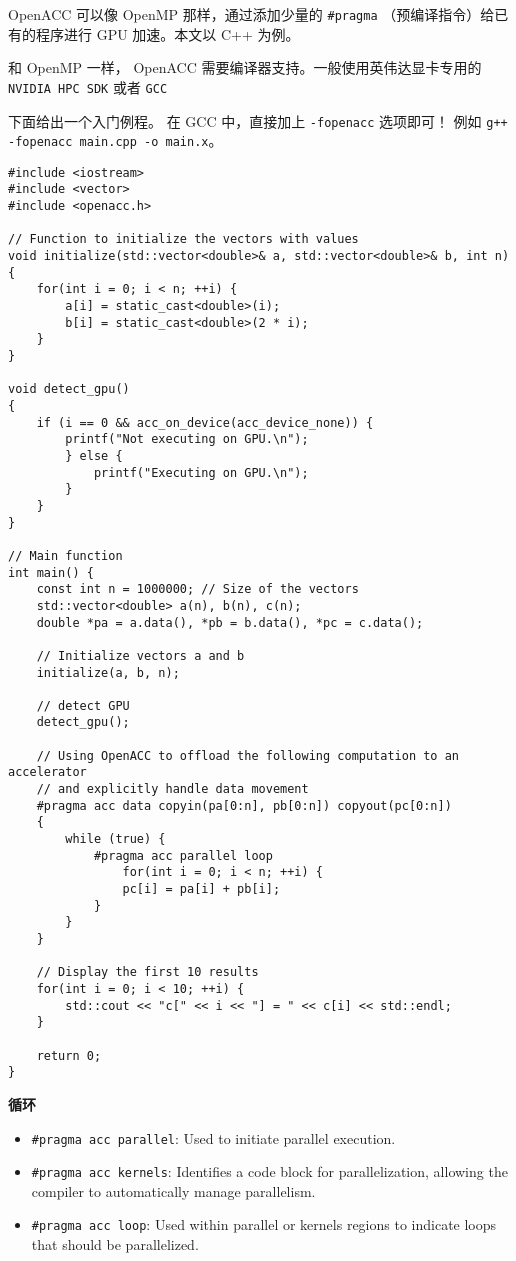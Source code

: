
\begin{issues}
\issueDraft
\end{issues}


OpenACC 可以像 OpenMP 那样，通过添加少量的 \verb`#pragma` （预编译指令）给已有的程序进行 GPU 加速。本文以 C++ 为例。

和 OpenMP 一样， OpenACC 需要编译器支持。一般使用英伟达显卡专用的 \verb`NVIDIA HPC SDK` 或者 \verb`GCC`

下面给出一个入门例程。 在 GCC 中，直接加上 \verb`-fopenacc` 选项即可！ 例如 \verb`g++ -fopenacc main.cpp -o main.x`。

\begin{lstlisting}[language=none,caption=test1.cpp]
#include <iostream>
#include <vector>
#include <openacc.h>

// Function to initialize the vectors with values
void initialize(std::vector<double>& a, std::vector<double>& b, int n) {
	for(int i = 0; i < n; ++i) {
		a[i] = static_cast<double>(i);
		b[i] = static_cast<double>(2 * i);
	}
}

void detect_gpu()
{
	if (i == 0 && acc_on_device(acc_device_none)) {
		printf("Not executing on GPU.\n");
		} else {
			printf("Executing on GPU.\n");
		}
	}
}

// Main function
int main() {
	const int n = 1000000; // Size of the vectors
	std::vector<double> a(n), b(n), c(n);
	double *pa = a.data(), *pb = b.data(), *pc = c.data();

	// Initialize vectors a and b
	initialize(a, b, n);

	// detect GPU
	detect_gpu();

	// Using OpenACC to offload the following computation to an accelerator
	// and explicitly handle data movement
	#pragma acc data copyin(pa[0:n], pb[0:n]) copyout(pc[0:n])
	{
		while (true) {
			#pragma acc parallel loop
				for(int i = 0; i < n; ++i) {
				pc[i] = pa[i] + pb[i];
			}
		}
	}

	// Display the first 10 results
	for(int i = 0; i < 10; ++i) {
		std::cout << "c[" << i << "] = " << c[i] << std::endl;
	}

	return 0;
}
\end{lstlisting}

\textbf{循环}
\begin{itemize}
\item \verb`#pragma acc parallel`: Used to initiate parallel execution.
\item \verb`#pragma acc kernels`: Identifies a code block for parallelization, allowing the compiler to automatically manage parallelism.
\item \verb`#pragma acc loop`: Used within parallel or kernels regions to indicate loops that should be parallelized.
\end{itemize}

